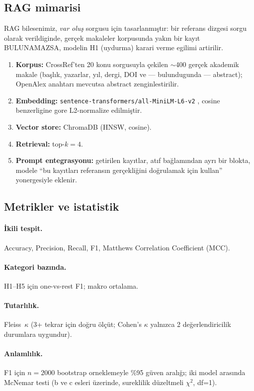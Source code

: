 \documentclass[11pt,a4paper]{article}
\begin{document}
\subsection{RAG mimarisi}
\label{sub:rag}
RAG bilesenimiz, \emph{var oluş} sorgusu için tasarlanmıştır: bir referans
dizgesi sorgu olarak verildiginde, gerçek makaleler korpusunda yakın bir
kayıt BULUNAMAZSA, modelin H1 (uydurma) karari verme egilimi artirilir.

\begin{enumerate}[nosep]
\item \textbf{Korpus:} CrossRef'ten 20 konu sorgusuyla çekilen $\sim$400 gerçek
akademik makale (başlık, yazarlar, yıl, dergi, DOI ve --- bulundugunda ---
abstract); OpenAlex anahtarı mevcutsa abstract zenginlestirilir.
\item \textbf{Embedding:} \texttt{sentence-transformers/all-MiniLM-L6-v2}
\cite{reimers2019sbert}, cosine benzerligine gore L2-normalize edilmiştir.
\item \textbf{Vector store:} ChromaDB (HNSW, cosine).
\item \textbf{Retrieval:} top-$k=4$.
\item \textbf{Prompt entegrasyonu:} getirilen kayıtlar, atıf bağlamından ayrı
bir blokta, modele ``bu kayıtları referansın gerçekliğini doğrulamak için
kullan'' yonergesiyle eklenir.
\end{enumerate}

\subsection{Metrikler ve istatistik}
\paragraph{İkili tespit.} Accuracy, Precision, Recall, F1, Matthews
Correlation Coefficient (MCC).
\paragraph{Kategori bazında.} H1--H5 için one-vs-rest F1; makro ortalama.
\paragraph{Tutarlılık.} Fleiss~$\kappa$ (3+ tekrar için
doğru ölçüt; Cohen's $\kappa$ yalnızca 2 değerlendiricilik durumlara uygundur).
\paragraph{Anlamlılık.} F1 için $n=2000$ bootstrap orneklemeyle \%95 güven
aralığı; iki model arasında McNemar testi (b ve c esleri üzerinde, sureklilik
düzeltmeli $\chi^2$, df=1).
\end{document}
